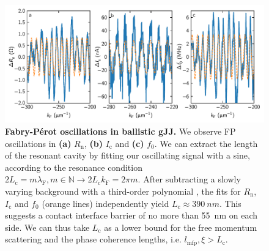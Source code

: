 \begin{figure}[]
	\centering
	\includegraphics[width=\linewidth]{chapter-gJJ/figs/si_fabryperot}
	\caption{{\bf Fabry-P\'erot oscillations in ballistic gJJ.}
		We observe FP oscillations in \textbf{(a)} $R_\text{n}$, \textbf{(b)} $I_\text{c}$ and \textbf{(c)} $f_0$.
		We can extract the length of the resonant cavity by fitting our oscillating signal with a sine, according to the resonance condition $2L_\text{c} = m\lambda_\text{F}, m\in\mathbb{N} \rightarrow 2L_\text{c} k_\text{F} = 2\pi m$.
		After subtracting a slowly varying background with a third-order polynomial \cite{calado_ballistic_2015a}, the fits for $R_\text{n}$, $I_\text{c}$ and $f_0$ (orange lines) independently yield $L_\text{c}\approx \SI{390}{nm}$.
		This suggests a contact interface barrier of no more than \SI{55}{nm} on each side.
		We can thus take $L_\text{c}$ as a lower bound for the free momentum scattering and the phase coherence lengths, i.e. $l_\text{mfp},\xi>L_\text{c}$.        }
	\label{fig:fabry-perot}
\end{figure}

